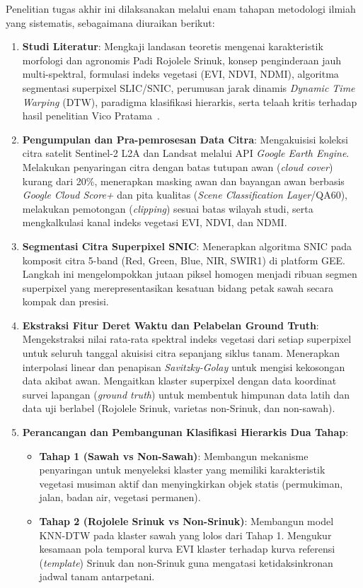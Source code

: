 Penelitian tugas akhir ini dilaksanakan melalui enam tahapan metodologi ilmiah yang sistematis, sebagaimana diuraikan berikut:

\begin{enumerate}
    \item \textbf{Studi Literatur}: Mengkaji landasan teoretis mengenai karakteristik morfologi dan agronomis Padi Rojolele Srinuk, konsep penginderaan jauh multi-spektral, formulasi indeks vegetasi (EVI, NDVI, NDMI), algoritma segmentasi superpixel SLIC/SNIC, perumusan jarak dinamis \textit{Dynamic Time Warping} (DTW), paradigma klasifikasi hierarkis, serta telaah kritis terhadap hasil penelitian Vico Pratama~\cite{pratama:25:vegetasi}.
    
    \item \textbf{Pengumpulan dan Pra-pemrosesan Data Citra}: Mengakuisisi koleksi citra satelit Sentinel-2 L2A dan Landsat melalui API \textit{Google Earth Engine}. Melakukan penyaringan citra dengan batas tutupan awan (\textit{cloud cover}) kurang dari 20\%, menerapkan masking awan dan bayangan awan berbasis \textit{Google Cloud Score+} dan pita kualitas (\textit{Scene Classification Layer}/QA60), melakukan pemotongan (\textit{clipping}) sesuai batas wilayah studi, serta mengkalkulasi kanal indeks vegetasi EVI, NDVI, dan NDMI.
    
    \item \textbf{Segmentasi Citra Superpixel SNIC}: Menerapkan algoritma SNIC pada komposit citra 5-band (Red, Green, Blue, NIR, SWIR1) di platform GEE. Langkah ini mengelompokkan jutaan piksel homogen menjadi ribuan segmen superpixel yang merepresentasikan kesatuan bidang petak sawah secara kompak dan presisi.
    
    \item \textbf{Ekstraksi Fitur Deret Waktu dan Pelabelan Ground Truth}: Mengekstraksi nilai rata-rata spektral indeks vegetasi dari setiap superpixel untuk seluruh tanggal akuisisi citra sepanjang siklus tanam. Menerapkan interpolasi linear dan penapisan \textit{Savitzky-Golay} untuk mengisi kekosongan data akibat awan. Mengaitkan klaster superpixel dengan data koordinat survei lapangan (\textit{ground truth}) untuk membentuk himpunan data latih dan data uji berlabel (Rojolele Srinuk, varietas non-Srinuk, dan non-sawah).
    
    \item \textbf{Perancangan dan Pembangunan Klasifikasi Hierarkis Dua Tahap}:
    \begin{itemize}
        \item \textbf{Tahap 1 (Sawah vs Non-Sawah)}: Membangun mekanisme penyaringan untuk menyeleksi klaster yang memiliki karakteristik vegetasi musiman aktif dan menyingkirkan objek statis (permukiman, jalan, badan air, vegetasi permanen).
        \item \textbf{Tahap 2 (Rojolele Srinuk vs Non-Srinuk)}: Membangun model KNN-DTW pada klaster sawah yang lolos dari Tahap 1. Mengukur kesamaan pola temporal kurva EVI klaster terhadap kurva referensi (\textit{template}) Srinuk dan non-Srinuk guna mengatasi ketidaksinkronan jadwal tanam antarpetani.
    \end{itemize}
    

\end{enumerate}
